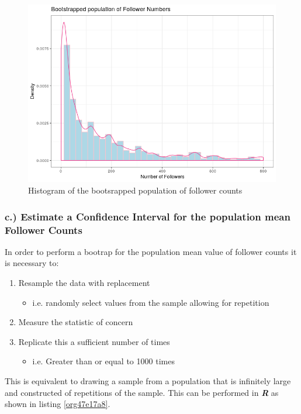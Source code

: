 \documentclass[11pt]{article}
\begin{document}
\begin{figure}[htbp]
\centering
\includegraphics[width=12cm]{./Figures/BootStrap_Pop.png}
\caption{\label{fig:orgbd8f9e7}Histogram of the bootsrapped population of follower counts}
\end{figure}

\subsubsection{c.) Estimate a Confidence Interval for the population mean Follower Counts}
\label{sec:org9298fdb}
In order to perform a bootrap for the population mean value of follower counts it is necessary to:

\begin{enumerate}
\item Resample the data with replacement
\begin{itemize}
\item i.e. randomly select values from the sample allowing for repetition
\end{itemize}
\item Measure the statistic of concern
\item Replicate this a sufficient number of times
\begin{itemize}
\item i.e. Greater than or equal to 1000 times \cite[Ch. 5]{davison1997}
\end{itemize}
\end{enumerate}

This is equivalent to drawing a sample from a population that is infinitely large and constructed of repetitions of the sample. This can be performed in \textbf{\emph{R}} as shown in listing \ref{org47e17a8}.
\end{document}
